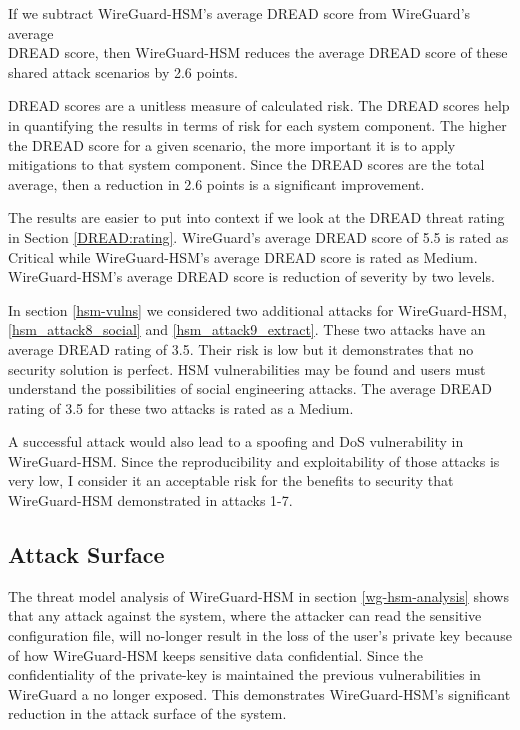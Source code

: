 \documentclass [11pt, proquest] {uwthesis}[2020/02/24]
\begin{document}
If we subtract WireGuard-HSM’s average DREAD score from WireGuard’s average\\
DREAD score, then WireGuard-HSM reduces the average DREAD score of these shared attack scenarios by 2.6 points.

DREAD scores are a unitless measure of calculated risk. The DREAD scores help in quantifying the results in terms of risk for each system component. The higher the DREAD score for a given scenario, the more important it is to apply mitigations to that system component. Since the DREAD scores are the total average, then a reduction in 2.6 points is a significant improvement.

The results are easier to put into context if we look at the DREAD threat rating in Section \ref{DREAD:rating}. WireGuard's average DREAD score of 5.5 is rated as Critical while WireGuard-HSM's average DREAD score is rated as Medium. WireGuard-HSM's average DREAD score is reduction of severity by two levels.

In section \ref{hsm-vulns} we considered two additional attacks for WireGuard-HSM, \ref{hsm_attack8_social} and \ref{hsm_attack9_extract}. 
These two attacks have an average DREAD rating of 3.5. Their risk is low but it demonstrates that no security solution is perfect. HSM vulnerabilities may be found and users must understand the possibilities of social engineering attacks. The average DREAD rating of 3.5 for these two attacks is rated as a Medium.

A successful attack would also lead to a spoofing and DoS vulnerability in WireGuard-HSM. Since the reproducibility and exploitability of those attacks is very low, I consider it an acceptable risk for the benefits to security that WireGuard-HSM demonstrated in attacks 1-7.


\subsection{Attack Surface}
\label{attacksurface}
The threat model analysis of WireGuard-HSM in section \ref{wg-hsm-analysis} shows that any attack against the system, where the attacker can read the sensitive configuration file, will no-longer result in the loss of the user's private key because of how WireGuard-HSM keeps sensitive data confidential. Since the confidentiality of the private-key is maintained the previous vulnerabilities in WireGuard a no longer exposed. This demonstrates WireGuard-HSM's significant reduction in the attack surface of the system.
\end{document}

